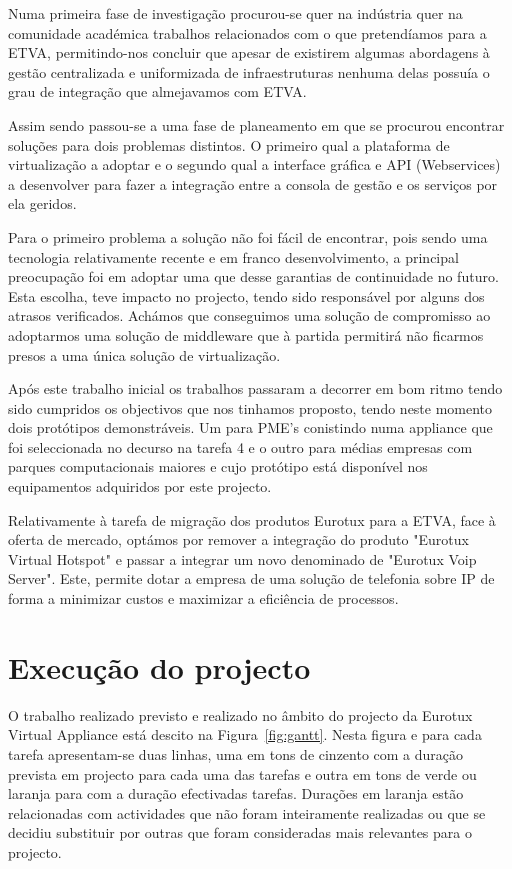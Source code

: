 \documentclass[a4paper,12pt,portugues]{article}
\begin{document}
Numa primeira fase de investigação procurou-se quer na indústria quer na
comunidade académica trabalhos relacionados com o que pretendíamos para a
ETVA, permitindo-nos concluir que apesar de existirem algumas abordagens à
gestão centralizada e uniformizada de infraestruturas nenhuma delas possuía o
grau de integração que almejavamos com ETVA.

Assim sendo passou-se a uma fase de planeamento em que se procurou encontrar
soluções para dois problemas distintos. O primeiro qual a plataforma de
virtualização a adoptar e o segundo qual a interface gráfica e API
(Webservices) a desenvolver para fazer a integração entre a consola de gestão
e os serviços por ela geridos.

Para o primeiro problema a solução não foi fácil de encontrar, pois sendo uma
tecnologia relativamente recente e em franco desenvolvimento, a principal
preocupação foi em adoptar uma que desse garantias de continuidade no futuro.
Esta escolha, teve impacto no projecto, tendo sido responsável por alguns dos
atrasos verificados. Achámos que conseguimos uma solução de compromisso ao
adoptarmos uma solução de middleware que à partida permitirá não ficarmos
presos a uma única solução de virtualização.

Após este trabalho inicial os trabalhos passaram a decorrer em bom ritmo tendo
sido cumpridos os objectivos que nos tinhamos proposto, tendo neste momento
dois protótipos demonstráveis. Um para PME's conistindo numa appliance que foi
seleccionada no decurso na tarefa 4 e o outro para médias empresas com parques
computacionais maiores e cujo protótipo está disponível nos equipamentos
adquiridos por este projecto.

Relativamente à tarefa de migração dos produtos Eurotux para a ETVA, face à
oferta de mercado, optámos por remover a integração do produto "Eurotux
Virtual Hotspot" e passar a integrar um novo denominado de "Eurotux Voip
Server". Este, permite dotar a empresa de uma solução de telefonia sobre IP de
forma a minimizar custos e maximizar a eficiência de processos.


\section{Execução do projecto} %
\label{sec:execucao_do_projecto}

O trabalho realizado previsto e realizado no âmbito do projecto da Eurotux
Virtual Appliance está descito na Figura~\ref{fig:gantt}. Nesta figura e para
cada tarefa apresentam-se duas linhas, uma em tons de cinzento com a duração
prevista em projecto para cada uma das tarefas e outra em tons de verde ou
laranja para com a duração efectivadas tarefas. Durações em laranja estão
relacionadas com actividades que não foram inteiramente realizadas ou que se
decidiu substituir por outras que foram consideradas mais relevantes para o
projecto.
\end{document}
